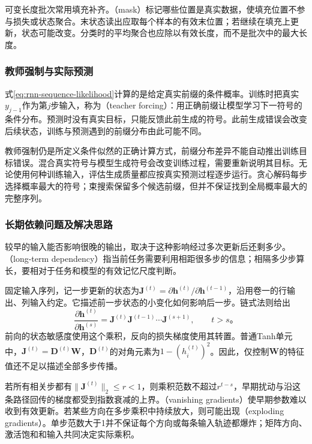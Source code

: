 可变长度批次常用填充补齐。（mask）标记哪些位置是真实数据，使填充位置不参与损失或状态聚合。末状态读出应取每个样本的有效末位置；若继续在填充上更新，状态可能改变。分类时的平均聚合也应除以有效长度，而不是批次中的最大长度。

\subsubsection{教师强制与实际预测}
\label{sec:rnn-teacher-forcing}

式\eqref{eq:rnn-sequence-likelihood}计算的是给定真实前缀的条件概率。训练时把真实$y_{j-1}$作为第$j$步输入，称为（teacher forcing）：用正确前缀让模型学习下一符号的条件分布。预测时没有真实目标，只能反馈此前生成的符号。此前生成错误会改变后续状态，训练与预测遇到的前缀分布由此可能不同。

教师强制仍是所定义条件似然的正确计算方式，前缀分布差异不能自动推出训练目标错误。混合真实符号与模型生成符号会改变训练过程，需要重新说明其目标。无论使用何种训练输入，评估生成质量都应按真实预测过程逐步运行。贪心解码每步选择概率最大的符号；束搜索保留多个候选前缀，但并不保证找到全局概率最大的完整序列。

\subsubsection{长期依赖问题及解决思路}
\label{sec:rnn-long-dependencies}

较早的输入能否影响很晚的输出，取决于这种影响经过多次更新后还剩多少。（long-term dependency）指当前任务需要利用相距很多步的信息；相隔多少步算长，要相对于任务和模型的有效记忆尺度判断。

固定输入序列，记一步更新的状态为$\bm{J}^{(t)}=\partial\bm{h}^{(t)}/\partial\bm{h}^{(t-1)}$，沿用卷一的行输出、列输入约定。它描述前一步状态的小变化如何影响后一步。链式法则给出
\begin{equation}
  \frac{\partial\bm{h}^{(t)}}{\partial\bm{h}^{(s)}}
    =\bm{J}^{(t)}\bm{J}^{(t-1)}\cdots\bm{J}^{(s+1)},
    \qquad t>s\text{。}
  \label{eq:rnn-jacobian-product}
\end{equation}
前向的状态敏感度使用这个乘积，反向的损失梯度使用其转置。普通Tanh单元中，$\bm{J}^{(t)}=\bm{D}^{(t)}\bm{W}$，$\bm{D}^{(t)}$的对角元素为$1-(h_i^{(t)})^2$。因此，仅控制$\bm{W}$的特征值还不足以描述全部多步传播。

若所有相关步都有$\lVert\bm{J}^{(t)}\rVert_2\leq r<1$，则乘积范数不超过$r^{t-s}$，早期扰动与沿这条路径回传的梯度都受到指数衰减的上界。（vanishing gradients）使早期参数难以收到有效更新。若某些方向在多步乘积中持续放大，则可能出现（exploding gradients）。单步范数大于1并不保证每个方向或每条输入轨迹都爆炸；矩阵方向、激活饱和和输入共同决定实际乘积。

